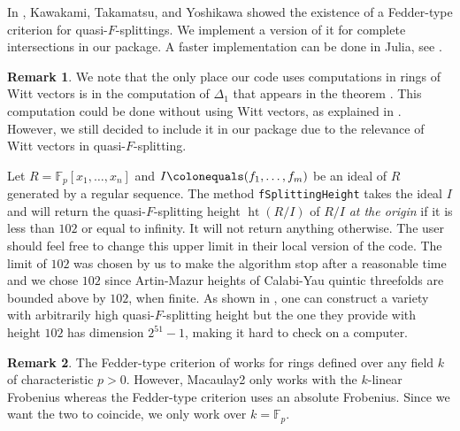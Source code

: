\documentclass{article}
\theoremstyle{plain}
\newtheorem{theorem}{Theorem}[section]
\theoremstyle{definition}
\newtheorem{remark}[theorem]{Remark}
\newcommand{\F}{\mathbb{F}}
\newcommand{\coloneqq}{\colonequals}
\DeclareMathOperator{\height}{ht}
\begin{document}
In \cite{KawakamiTakamatsuYoshikawaFedderQuasi}, Kawakami, Takamatsu, and Yoshikawa showed the existence of a Fedder-type criterion for quasi-$F$-splittings. We implement a version of it for complete intersections in our package. A faster implementation can be done in Julia, see \cite{BatubaraGarzellaPanFastAlgorithmQuasiFSplitting}. 

\begin{remark}
    We note that the only place our code uses computations in rings of Witt vectors is in the computation of $\Delta_1$ that appears in the theorem \cite[Theorem 5.8]{KawakamiTakamatsuYoshikawaFedderQuasi}. This computation could be done without using Witt vectors, as explained in \cite[Section 1.1]{KawakamiTakamatsuYoshikawaFedderQuasi}. However, we still decided to include it in our package due to the relevance of Witt vectors in quasi-$F$-splitting.
\end{remark}

Let $R=\F_p[x_1,\ldots,x_n]$ and $I\coloneqq(f_1,\ldots,f_m)$ be an ideal of $R$ generated by a regular sequence. 
The method \texttt{fSplittingHeight} 
takes the ideal $I$ and will return the quasi-$F$-splitting height $\height(R/I)$ of $R/I$ \emph{at the origin} if it is less than $102$ or equal to infinity. It will not return anything otherwise. The user should feel free to change this upper limit in their local version of the code.
The limit of $102$ was chosen by us to make the algorithm stop after a reasonable time and we chose $102$ since Artin-Mazur heights of Calabi-Yau quintic threefolds are bounded above by
$102$, when finite. As shown in \cite[Example 7.17]{KawakamiTakamatsuYoshikawaFedderQuasi}, one can construct a variety with arbitrarily high quasi-$F$-splitting height but the one they provide with height $102$ has dimension $2^{51}-1$, making it hard to check on a computer.  


\begin{remark}
The Fedder-type criterion of \cite[Theorem 5.8]{KawakamiTakamatsuYoshikawaFedderQuasi} works for rings defined over any field $k$ of characteristic $p>0$. However, Macaulay2 only works with the $k$-linear Frobenius whereas the Fedder-type criterion uses an absolute Frobenius. Since we want the two to coincide, we only work over $k=\F_p$.
\end{remark}
\end{document}
